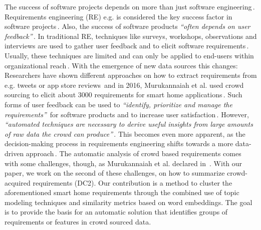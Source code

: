 The success of software projects depends on more than just software engineering\,\cite{mohagheghi_what_2017}. Requirements engineering (RE) e.g. is considered the key success factor in software projects\,\cite{mavin_towards_2019}. Also, the success of software products \textit{``often  depends  on  user  feedback''}\,\cite{maalej_toward_2016}. In traditional RE, techniques like surveys, workshops, observations and interviews are used to gather user feedback and to elicit software requirements\,\cite{pohl_requirements_2015}. Usually, these techniques are limited and can only be applied to end-users within organizational reach\,\cite{oriol_fame_2018}. With the emergence of new data sources this changes: Researchers have shown different approaches on how to extract requirements from e.g. tweets or app store reviews\,\cite{oriol_fame_2018,stanik_classifying_2019} and in 2016, Murukannaiah et al. used crowd sourcing to elicit about 3000 requirements for smart home applications\,\cite{murukannaiah_acquiring_2016}. Such forms of user feedback can be used to \textit{``identify, prioritize and manage the requirements''}\,\cite{maalej_toward_2016} for software products and to increase user satisfaction\,\cite{palomba_user_2015}. However, \textit{``automated techniques are necessary to derive useful insights from large amounts of raw data the crowd can produce''}\,\cite{murukannaiah_toward_2017}. This becomes even more apparent, as the decision-making process in requirements engineering shifts towards a more data-driven approach\,\cite{maalej_data-driven_2019}. The automatic analysis of crowd based requirements comes with some challenges, though, as Murukannaiah et al. declared in \,\cite{murukannaiah_toward_2017}. With our paper, we work on the second of these challenges, on how to summarize crowd-acquired requirements (DC2). Our contribution is a method to cluster the aforementioned smart home requirements through the combined use of topic modeling techniques and similarity metrics based on word embeddings. The goal is to provide the basis for an automatic solution that identifies groups of requirements or features in crowd sourced data. 
